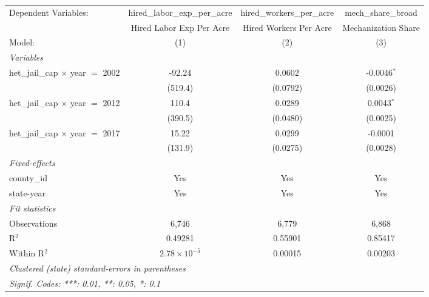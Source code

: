 
\begingroup
\centering
\begin{tabular}{lccc}
   \tabularnewline \midrule \midrule
   Dependent Variables:                     & hired\_labor\_exp\_per\_acre     & hired\_workers\_per\_acre    & mech\_share\_broad\\    
                                            & Hired Labor Exp Per Acre         & Hired Workers Per Acre       & Mechanization Share \\   
   Model:                                   & (1)                              & (2)                          & (3)\\  
   \midrule
   \emph{Variables}\\
   het\_jail\_cap $\times$ year $=$ 2002    & -92.24                           & 0.0602                       & -0.0046$^{*}$\\   
                                            & (519.4)                          & (0.0792)                     & (0.0026)\\   
   het\_jail\_cap $\times$ year $=$ 2012    & 110.4                            & 0.0289                       & 0.0043$^{*}$\\   
                                            & (390.5)                          & (0.0480)                     & (0.0025)\\   
   het\_jail\_cap $\times$ year $=$ 2017    & 15.22                            & 0.0299                       & -0.0001\\   
                                            & (131.9)                          & (0.0275)                     & (0.0028)\\   
   \midrule
   \emph{Fixed-effects}\\
   county\_id                               & Yes                              & Yes                          & Yes\\  
   state-year                               & Yes                              & Yes                          & Yes\\  
   \midrule
   \emph{Fit statistics}\\
   Observations                             & 6,746                            & 6,779                        & 6,868\\  
   R$^2$                                    & 0.49281                          & 0.55901                      & 0.85417\\  
   Within R$^2$                             & $2.78\times 10^{-5}$             & 0.00015                      & 0.00203\\  
   \midrule \midrule
   \multicolumn{4}{l}{\emph{Clustered (state) standard-errors in parentheses}}\\
   \multicolumn{4}{l}{\emph{Signif. Codes: ***: 0.01, **: 0.05, *: 0.1}}\\
\end{tabular}
\par\endgroup


